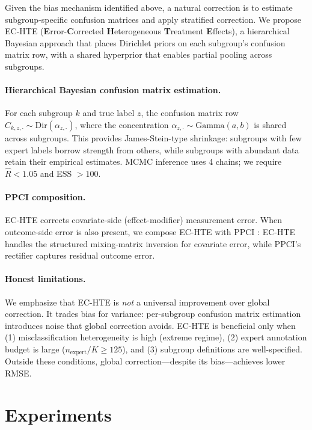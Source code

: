 \documentclass[11pt]{article}
\begin{document}
Given the bias mechanism identified above, a natural correction is to estimate subgroup-specific confusion matrices and apply stratified correction.
We propose EC-HTE (\textbf{E}rror-\textbf{C}orrected \textbf{H}eterogeneous \textbf{T}reatment \textbf{E}ffects), a hierarchical Bayesian approach that places Dirichlet priors on each subgroup's confusion matrix row, with a shared hyperprior that enables partial pooling across subgroups.

\paragraph{Hierarchical Bayesian confusion matrix estimation.}
For each subgroup $k$ and true label $z$, the confusion matrix row $C_{k,z,\cdot} \sim \text{Dir}(\alpha_{z,\cdot})$, where the concentration $\alpha_{z,\cdot} \sim \text{Gamma}(a, b)$ is shared across subgroups.
This provides James-Stein-type shrinkage: subgroups with few expert labels borrow strength from others, while subgroups with abundant data retain their empirical estimates.
MCMC inference uses 4 chains; we require $\hat{R} < 1.05$ and ESS $> 100$.

\paragraph{PPCI composition.}
EC-HTE corrects covariate-side (effect-modifier) measurement error.
When outcome-side error is also present, we compose EC-HTE with PPCI \citep{sui2026ppci}: EC-HTE handles the structured mixing-matrix inversion for covariate error, while PPCI's rectifier captures residual outcome error.

\paragraph{Honest limitations.}
We emphasize that EC-HTE is \emph{not} a universal improvement over global correction.
It trades bias for variance: per-subgroup confusion matrix estimation introduces noise that global correction avoids.
EC-HTE is beneficial only when (1) misclassification heterogeneity is high (extreme regime), (2) expert annotation budget is large ($n_{\text{expert}}/K \geq 125$), and (3) subgroup definitions are well-specified.
Outside these conditions, global correction---despite its bias---achieves lower RMSE.

\section{Experiments}
\label{sec:experiments}
\end{document}
